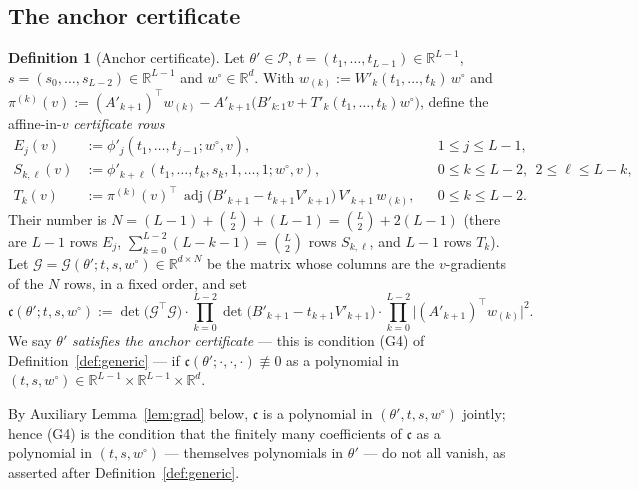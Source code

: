 \documentclass[11pt]{article}
\theoremstyle{definition}
\newtheorem{definition}[theorem]{Definition}
\theoremstyle{remark}
\theoremstyle{plain}
\newcommand{\R}{\mathbb{R}}
\newcommand{\cP}{\mathcal{P}}
\newcommand{\adj}{\operatorname{adj}}
\begin{document}
\subsection{The anchor certificate}

\begin{definition}[Anchor certificate]\label{def:certificate}
Let $\theta'\in\cP$, $t=(t_1,\dots,t_{L-1})\in\R^{L-1}$,
$s=(s_0,\dots,s_{L-2})\in\R^{L-1}$ and $w^\circ\in\R^d$.  With
$w_{(k)}:=W'_k(t_1,\dots,t_k)\,w^\circ$ and
$\pi^{(k)}(v):=(A'_{k+1})^\top w_{(k)}
-A'_{k+1}\big(B'_{k:1}v+T'_k(t_1,\dots,t_k)w^\circ\big)$, define the affine-in-$v$
\emph{certificate rows}
\begin{align*}
E_j(v)&:=\phi'_j(t_1,\dots,t_{j-1};w^\circ,v), &&1\le j\le L-1,\\
S_{k,\ell}(v)&:=\phi'_{k+\ell}(t_1,\dots,t_k,s_k,1,\dots,1;w^\circ,v),
&&0\le k\le L-2,\ \ 2\le\ell\le L-k,\\
T_k(v)&:=\pi^{(k)}(v)^\top\,\adj\!\big(B'_{k+1}-t_{k+1}V'_{k+1}\big)\,
V'_{k+1}\,w_{(k)},&&0\le k\le L-2 .
\end{align*}
Their number is
$N=(L-1)+\binom L2+(L-1)=\binom L2+2(L-1)$ (there are $L-1$ rows $E_j$,
$\sum_{k=0}^{L-2}(L-k-1)=\binom L2$ rows $S_{k,\ell}$, and $L-1$ rows $T_k$).  Let
$\mathcal G=\mathcal G(\theta';t,s,w^\circ)\in\R^{d\times N}$ be the matrix whose
columns are the $v$-gradients of the $N$ rows, in a fixed order, and set
\[
\mathfrak c(\theta';t,s,w^\circ)
:=\det\!\big(\mathcal G^\top\mathcal G\big)\cdot
\prod_{k=0}^{L-2}\det\!\big(B'_{k+1}-t_{k+1}V'_{k+1}\big)\cdot
\prod_{k=0}^{L-2}\big|(A'_{k+1})^\top w_{(k)}\big|^2 .
\]
We say $\theta'$ \emph{satisfies the anchor certificate} --- this is condition
\textup{(G4)} of Definition~\ref{def:generic} --- if
$\mathfrak c(\theta';\cdot,\cdot,\cdot)\not\equiv0$ as a polynomial in
$(t,s,w^\circ)\in\R^{L-1}\times\R^{L-1}\times\R^d$.
\end{definition}

By Auxiliary Lemma~\ref{lem:grad} below, $\mathfrak c$ is a polynomial in
$(\theta',t,s,w^\circ)$ jointly; hence (G4) is the condition that the finitely many
coefficients of $\mathfrak c$ as a polynomial in $(t,s,w^\circ)$ --- themselves
polynomials in $\theta'$ --- do not all vanish, as asserted after
Definition~\ref{def:generic}.
\end{document}
